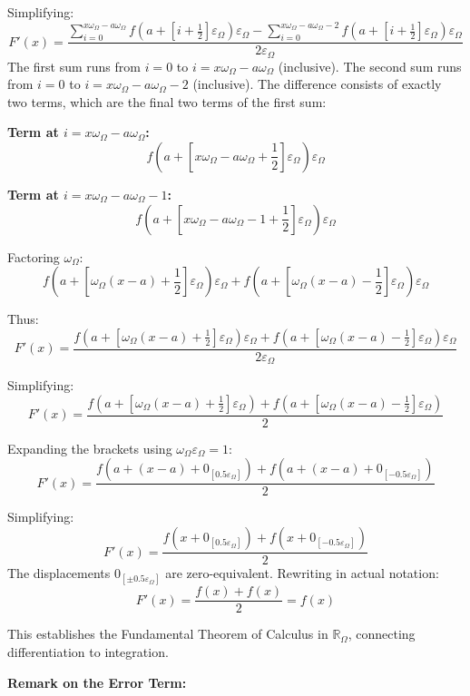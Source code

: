 \documentclass{article}
\begin{document}
Simplifying:
$$F'(x) = \frac{\displaystyle \sum_{i=0}^{x\omega_\Omega - a\omega_\Omega} f\left(a + \left[i + \frac{1}{2}\right]\varepsilon_\Omega\right)\varepsilon_\Omega - \sum_{i=0}^{x\omega_\Omega - a\omega_\Omega - 2} f\left(a + \left[i + \frac{1}{2}\right]\varepsilon_\Omega\right)\varepsilon_\Omega}{2\varepsilon_\Omega}$$The first sum runs from $i = 0$ to $i = x\omega_\Omega - a\omega_\Omega$ (inclusive). The second sum runs from $i = 0$ to $i = x\omega_\Omega - a\omega_\Omega - 2$ (inclusive). The difference consists of exactly two terms, which are the final two terms of the first sum:

\textbf{Term at $i = x\omega_\Omega - a\omega_\Omega$:}
$$f\left(a + \left[x\omega_\Omega - a\omega_\Omega + \frac{1}{2}\right]\varepsilon_\Omega\right)\varepsilon_\Omega$$

\textbf{Term at $i = x\omega_\Omega - a\omega_\Omega - 1$:}
$$f\left(a + \left[x\omega_\Omega - a\omega_\Omega - 1 + \frac{1}{2}\right]\varepsilon_\Omega\right)\varepsilon_\Omega$$

Factoring $\omega_\Omega$:
$$f\left(a + \left[\omega_\Omega(x - a) + \frac{1}{2}\right]\varepsilon_\Omega\right)\varepsilon_\Omega + f\left(a + \left[\omega_\Omega(x - a) - \frac{1}{2}\right]\varepsilon_\Omega\right)\varepsilon_\Omega$$

Thus:
$$F'(x) = \frac{f\left(a + \left[\omega_\Omega(x - a) + \frac{1}{2}\right]\varepsilon_\Omega\right)\varepsilon_\Omega + f\left(a + \left[\omega_\Omega(x - a) - \frac{1}{2}\right]\varepsilon_\Omega\right)\varepsilon_\Omega}{2\varepsilon_\Omega}$$

Simplifying:
$$F'(x) = \frac{f\left(a + \left[\omega_\Omega(x - a) + \frac{1}{2}\right]\varepsilon_\Omega\right) + f\left(a + \left[\omega_\Omega(x - a) - \frac{1}{2}\right]\varepsilon_\Omega\right)}{2}$$

Expanding the brackets using $\omega_\Omega \varepsilon_\Omega = 1$:
$$F'(x) = \frac{f\left(a + (x - a) + 0_{[0.5\varepsilon_\Omega]}\right) + f\left(a + (x - a) + 0_{[-0.5\varepsilon_\Omega]}\right)}{2}$$

Simplifying:
$$F'(x) = \frac{f(x + 0_{[0.5\varepsilon_\Omega]}) + f(x + 0_{[-0.5\varepsilon_\Omega]})}{2}$$The displacements $0_{[\pm 0.5\varepsilon_\Omega]}$ are zero-equivalent. Rewriting in actual notation:
$$F'(x) = \frac{f(x) + f(x)}{2} = f(x)$$

This establishes the Fundamental Theorem of Calculus in $\mathbb{R}_\Omega$, connecting differentiation to integration.

\textbf{Remark on the Error Term:}
\end{document}
